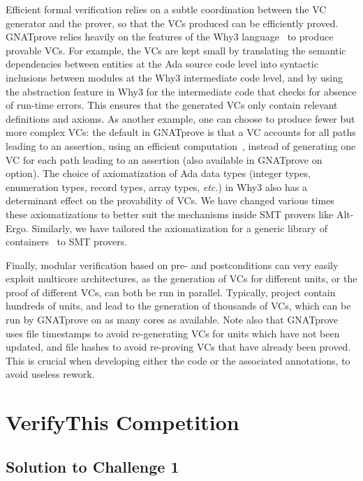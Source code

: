 \documentclass[sttt,draft]{svjour}
\newcommand{\gnatprove}{GNATprove\xspace}
\newcommand{\etc}{\textit{etc.}\xspace}
\begin{document}
Efficient formal verification relies on a subtle coordination between the VC
generator and the prover, so that the VCs produced can be efficiently
proved. \gnatprove relies heavily on the features of the Why3
language~\cite{guitton2011boogie} to produce provable VCs. For example, the VCs
are kept small by translating the semantic dependencies between entities at the
Ada source code level into syntactic inclusions between modules at the Why3
intermediate code level, and by using the abstraction feature in Why3 for the
intermediate code that checks for absence of run-time errors. This ensures that
the generated VCs only contain relevant definitions and axioms. As another
example, one can choose to produce fewer but more complex VCs: the default in
\gnatprove is that a VC accounts for all paths leading to an assertion, using
an efficient computation~\cite{leino2005ipl}, instead of generating one VC for
each path leading to an assertion (also available in \gnatprove on option). The
choice of axiomatization of Ada data types (integer types, enumeration types,
record types, array types, \etc) in Why3 also has a determinant effect on the
provability of VCs. We have changed various times these axiomatizations to
better suit the mechanisms inside SMT provers like Alt-Ergo. Similarly, we have
tailored the axiomatization for a generic library of
containers~\cite{dross:2011:tap} to SMT provers.

Finally, modular verification based on pre- and postconditions can very easily
exploit multicore architectures, as the generation of VCs for different units,
or the proof of different VCs, can both be run in parallel. Typically, project
contain hundreds of units, and lead to the generation of thousands of VCs,
which can be run by \gnatprove on as many cores as available. Note also that
\gnatprove uses file timestamps to avoid re-generating VCs for units which have
not been updated, and file hashes to avoid re-proving VCs that have already
been proved. This is crucial when developing either the code or the associated
annotations, to avoid useless rework.

\section{VerifyThis Competition}
\label{verifythis}

\subsection{Solution to Challenge 1}
\end{document}
